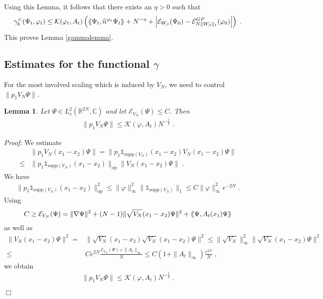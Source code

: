 \documentclass[11pt, english, american]{article}
\newcommand{\laa}{\langle\hspace{-0.08cm}\langle}
\newcommand{\raa}{\rangle\hspace{-0.08cm}\rangle}
\newtheorem{lemma}[theorem]{Lemma}
\newenvironment{proof}{\emph{Proof:}}{\begin{flushright} $ \Box $ \end{flushright}}
\renewcommand{\phi}{\varphi}
\begin{document}
Using this Lemma, it follows that there exists an $\eta>0$ such that
\begin{equation*}
\gamma_b^< (\Psi_t,\phi_t) \leq 
\mathcal{K}(\phi_t,A_t)
\left(
 \laa\Psi_t,\widehat{n}^{\phi_t}\Psi_t\raa + N^{-\eta}+
\left|
\mathcal{E}_{W_\beta}(\Psi_0)
-
\mathcal{E}_{N \|W_\beta\|_1}^ {GP}(\phi_0)
\right|
 \right)\;.
 \end{equation*}
This proves Lemma \ref{gammalemma}.


\subsection{Estimates for the functional $\gamma$}
\label{gammacontrolsection}
For the most involved scaling which is induced by $V_N$, we need to control $ \|p_1 V_N \Psi\|$.
\begin{lemma}
Let $\Psi \in L_s^2 (\mathbb{R}^{2N}, \mathbb{C})$ and let
$\mathcal{E}_{V_N}(\Psi) \leq C$. Then
\begin{align} \label{p1 VN abschaetzung}
\|p_1 V_N \Psi\| \leq   \mathcal{K}(\phi, A_t) N^{-\frac{1}{2}}
\;.
\end{align}
\end{lemma}
\begin{proof}
We estimate
\begin{align*}
&\|p_1 V_N(x_1-x_2) \Psi\|= \|p_1 \mathds{1}_{\text{supp}(V_N)}(x_1-x_2) V_N(x_1-x_2) \Psi\|
\\
\leq & \|p_1 \mathds{1}_{\text{supp}(V_N)}(x_1-x_2) \|_{\text{op}} \| V_N(x_1-x_2) \Psi\|
\;.
\end{align*}
We have
\begin{align*}
\|p_1 \mathds{1}_{\text{supp}(V_N)} (x_1-x_2)\|_{\text{op}}^2\leq \| \varphi \|_\infty^2 
\|\mathds{1}_{\text{supp}(V_N)} \|_1 \leq C  \| \varphi \|_\infty^2  e^{-2N}
\;.
\end{align*}
Using
\begin{align*}
C \geq \mathcal{E}_{V_N}(\Psi)= \| \nabla \Psi \|^2 + (N-1) \| \sqrt{V_N}(x_1-x_2) \Psi \|^2
+
\laa \Psi, A_t(x_1) \Psi \raa
\end{align*}
as well as
\begin{align*}
\| V_N(x_1-x_2) \Psi\|^2 =& \| \sqrt{V_N} (x_1-x_2)\sqrt{ V_N}(x_1-x_2) \Psi\|^2
\leq
\| \sqrt{V_N}\|_{\infty}^2 \| \sqrt{V_N}(x_1-x_2) \Psi \|^2
\nonumber
\\
\leq&
C e^{2N} \frac{\mathcal{E}_{V_N}(\Psi)+ \| A_t \|_\infty }{N} 
\leq
 C  (1+ \| A_t \|_\infty) \frac{e^{2N}}{N}
 \;,
\end{align*}
we obtain
\begin{align*} 
\|p_1 V_N \Psi\| \leq 
 \mathcal{K}(\phi, A_t) N^{-\frac{1}{2}} \;.
\end{align*}
\end{proof}
\end{document}
